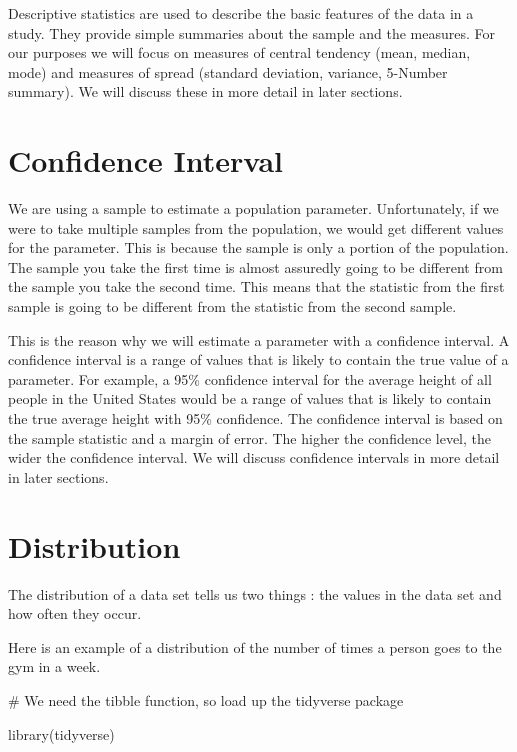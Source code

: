 \documentclass[
  letterpaper,
  DIV=11,
  numbers=noendperiod]{scrreprt}
\newenvironment{Shaded}{\begin{snugshade}}{\end{snugshade}}
\newcommand{\CommentTok}[1]{\textcolor[rgb]{0.37,0.37,0.37}{#1}}
\newcommand{\FunctionTok}[1]{\textcolor[rgb]{0.28,0.35,0.67}{#1}}
\newcommand{\NormalTok}[1]{\textcolor[rgb]{0.00,0.23,0.31}{#1}}
\begin{document}
Descriptive statistics are used to describe the basic features of the
data in a study. They provide simple summaries about the sample and the
measures. For our purposes we will focus on measures of central tendency
(mean, median, mode) and measures of spread (standard deviation,
variance, 5-Number summary). We will discuss these in more detail in
later sections.

\section*{Confidence Interval}\label{confidence-interval}


We are using a sample to estimate a population parameter. Unfortunately,
if we were to take multiple samples from the population, we would get
different values for the parameter. This is because the sample is only a
portion of the population. The sample you take the first time is almost
assuredly going to be different from the sample you take the second
time. This means that the statistic from the first sample is going to be
different from the statistic from the second sample.

This is the reason why we will estimate a parameter with a confidence
interval. A confidence interval is a range of values that is likely to
contain the true value of a parameter. For example, a 95\% confidence
interval for the average height of all people in the United States would
be a range of values that is likely to contain the true average height
with 95\% confidence. The confidence interval is based on the sample
statistic and a margin of error. The higher the confidence level, the
wider the confidence interval. We will discuss confidence intervals in
more detail in later sections.

\section*{Distribution}\label{distribution}


The distribution of a data set tells us two things : the values in the
data set and how often they occur.

Here is an example of a distribution of the number of times a person
goes to the gym in a week.

\begin{Shaded}
\begin{Highlighting}[]
\CommentTok{\# We need the tibble function, so load up the tidyverse package}

\FunctionTok{library}\NormalTok{(tidyverse)}
\end{Highlighting}
\end{Shaded}
\end{document}
